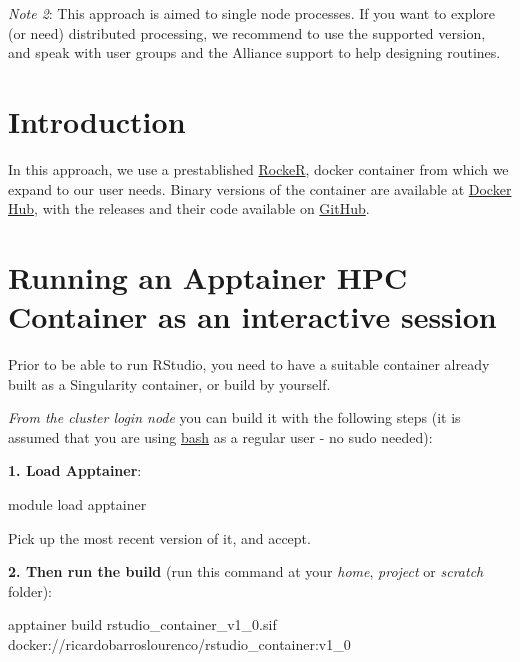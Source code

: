 \documentclass[
]{book}
\newenvironment{Shaded}{\begin{snugshade}}{\end{snugshade}}
\newcommand{\ExtensionTok}[1]{#1}
\newcommand{\NormalTok}[1]{#1}
\begin{document}
\emph{Note 2}: This approach is aimed to single node processes. If you want to
explore (or need) distributed processing, we recommend to use the supported
version, and speak with user groups and the Alliance support to help designing routines.

\hypertarget{introduction}{%
\section{Introduction}\label{introduction}}

In this approach, we use a prestablished \href{https://rocker-project.org/}{RockeR},
docker container from which we expand to our user needs. Binary versions of the
container are available at \href{https://hub.docker.com/repository/docker/ricardobarroslourenco/rstudio_container/general}{Docker Hub}, with the releases and their code available on \href{https://github.com/MacRemoteSensing/rstudio_container/releases}{GitHub}.

\hypertarget{running-an-apptainer-hpc-container-as-an-interactive-session}{%
\section{Running an Apptainer HPC Container as an interactive session}\label{running-an-apptainer-hpc-container-as-an-interactive-session}}

Prior to be able to run RStudio, you need to have a suitable container already built
as a Singularity container, or build by yourself.

\emph{From the cluster login node} you can build it with the following steps (it is assumed that you are using \href{https://en.wikipedia.org/wiki/Bash_(Unix_shell)}{bash} as a regular user - no sudo needed):

\textbf{1. Load Apptainer}:

\begin{Shaded}
\begin{Highlighting}[]
\ExtensionTok{module}\NormalTok{ load apptainer}
\end{Highlighting}
\end{Shaded}

Pick up the most recent version of it, and accept.

\textbf{2. Then run the build} (run this command at your \emph{home}, \emph{project} or \emph{scratch} folder):

\begin{Shaded}
\begin{Highlighting}[]
\ExtensionTok{apptainer}\NormalTok{ build rstudio\_container\_v1\_0.sif docker://ricardobarroslourenco/rstudio\_container:v1\_0}
\end{Highlighting}
\end{Shaded}
\end{document}
